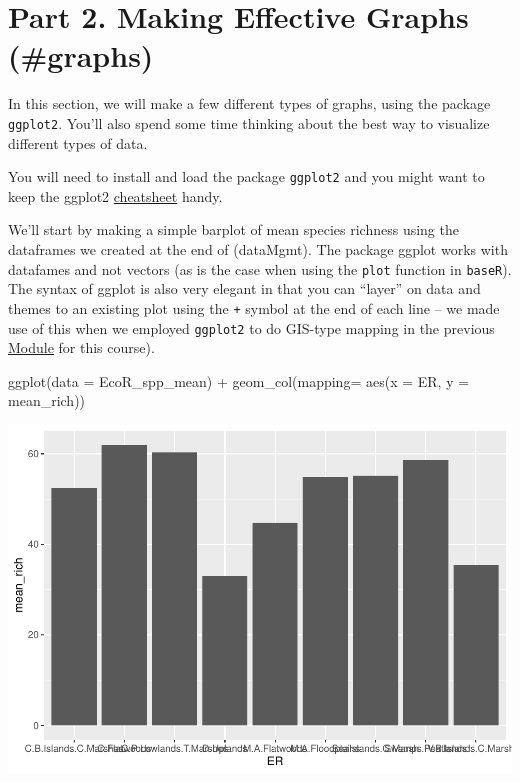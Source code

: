 \documentclass[
]{book}
\newenvironment{Shaded}{\begin{snugshade}}{\end{snugshade}}
\newcommand{\AttributeTok}[1]{\textcolor[rgb]{0.77,0.63,0.00}{#1}}
\newcommand{\FunctionTok}[1]{\textcolor[rgb]{0.00,0.00,0.00}{#1}}
\newcommand{\NormalTok}[1]{#1}
\newcommand{\SpecialCharTok}[1]{\textcolor[rgb]{0.00,0.00,0.00}{#1}}
\begin{document}
\hypertarget{part-2.-making-effective-graphs-graphs}{%
\chapter{Part 2. Making Effective Graphs (\#graphs)}\label{part-2.-making-effective-graphs-graphs}}

In this section, we will make a few different types of graphs, using the package \texttt{ggplot2}. You'll also spend some time thinking about the best way to visualize different types of data.

You will need to install and load the package \texttt{ggplot2} and you might want to keep the ggplot2 \href{https://rstudio.com/wp-content/uploads/2016/11/ggplot2-cheatsheet-2.1.pdf}{cheatsheet} handy.

We'll start by making a simple barplot of mean species richness using the dataframes we created at the end of \citet{ref}(dataMgmt). The package ggplot works with datafames and not vectors (as is the case when using the \texttt{plot} function in \texttt{baseR}). The syntax of ggplot is also very elegant in that you can ``layer'' on data and themes to an existing plot using the \texttt{+} symbol at the end of each line -- we made use of this when we employed \texttt{ggplot2} to do GIS-type mapping in the previous \href{https://nlboreal.github.io/ConservationGIS/}{Module} for this course).

\begin{Shaded}
\begin{Highlighting}[]
\FunctionTok{ggplot}\NormalTok{(}\AttributeTok{data =}\NormalTok{ EcoR\_spp\_mean) }\SpecialCharTok{+}
  \FunctionTok{geom\_col}\NormalTok{(}\AttributeTok{mapping=} \FunctionTok{aes}\NormalTok{(}\AttributeTok{x =}\NormalTok{ ER, }\AttributeTok{y =}\NormalTok{ mean\_rich))}
\end{Highlighting}
\end{Shaded}

\includegraphics{bookdown-demo_files/figure-latex/unnamed-chunk-9-1.pdf}
\end{document}
